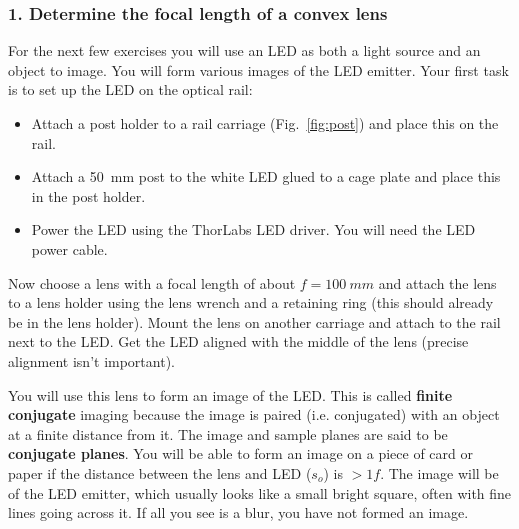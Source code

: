 \documentclass[a4paper]{report}
\begin{document}
	
	\clearpage
	
	
	
	
	\subsubsection{1. Determine the focal length of a convex lens }
	For the next few exercises you will use an LED as both a light source and an object to image.
	You will form various images of the LED emitter. 
	Your first task is to set up the LED on the optical rail:
	
	\begin{itemize}
		\item Attach a post holder to a rail carriage (Fig.~\ref{fig:post}) and place this on the rail. 
		\item Attach a 50~mm post to the white LED glued to a cage plate and place this in the post holder. 
		\item Power the LED using the ThorLabs LED driver. You will need the LED power cable.
	\end{itemize}
	
	
	Now choose a lens with a focal length of about $f=100~mm$ and attach the lens to a lens holder using the lens wrench and a retaining ring (this should already be in the lens holder).
	Mount the lens on another carriage and attach to the rail next to the LED. 
	Get the LED aligned with the middle of the lens (precise alignment isn't important). 
	
	You will use this lens to form an image of the LED.
	This is called \textbf{finite conjugate} imaging because the image is paired (i.e. conjugated) with an object at a finite distance from it.
	The image and sample planes are said to be \textbf{conjugate planes}.
	You will be able to form an image on a piece of card or paper if the distance between the lens and LED ($s_o$) is $>1f$.
	The image will be of the LED emitter, which  usually looks like a small bright square, often with fine lines going across it. 
	If all you see is a blur, you have not formed an image.
	
\end{document}
